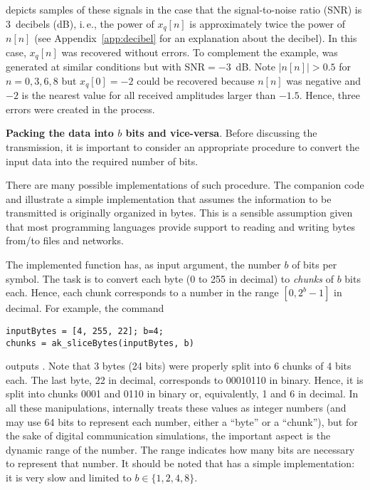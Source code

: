  depicts samples of these signals in the case that the signal-to-noise ratio (SNR) is 3~decibels (dB), i.\,e., the power of $x_q[n]$ is approximately twice the power of $n[n]$ (see Appendix~\ref{app:decibel} for an explanation about the decibel). In this case, $x_q[n]$ was recovered without errors. To complement the example,  was generated at similar conditions but with SNR$=-3$~dB. 
Note $\lvert n[n]\rvert>0.5$ for $n=0,3,6,8$ but $x_q[0]=-2$ could be recovered because $n[n]$ was negative and $-2$ is the nearest value for all received amplitudes larger than $-1.5$.
Hence, three errors were created in the process.
\eApplication

\bApplication 
\textbf{Packing the data into $b$ bits and vice-versa}.
\label{app:matlabpackunpack}
Before discussing the transmission, it is important to consider an appropriate procedure to convert the input data into the required number of bits.

There are many possible implementations of such procedure. The companion code  and  illustrate a simple implementation that assumes the information to be transmitted is originally organized in bytes. This is a sensible assumption given that most programming languages provide support to reading and writing bytes from/to files and networks.

The implemented function has, as input argument, the number $b$ of bits per symbol. The task is to convert each byte (0 to 255 in decimal) to \emph{chunks} of $b$ bits each. Hence, each chunk corresponds to a number in the range $[0, 2^{b}-1]$ in decimal. For example, the command
\begin{lstlisting}
inputBytes = [4, 255, 22]; b=4;
chunks = ak_sliceBytes(inputBytes, b)
\end{lstlisting}
outputs . Note that 3 bytes (24 bits) were properly split into 6 chunks of 4 bits each. The last byte, 22 in decimal, corresponds to 00010110 in binary. Hence, it is split into chunks 0001 and 0110 in binary or, equivalently, 1 and 6 in decimal. In all these manipulations, {\matlab} internally treats these values as integer numbers (and may use 64 bits to represent each number, either a ``byte'' or a ``chunk''), but for the sake of digital communication simulations, the important aspect is the dynamic range of the number. The range indicates how many bits are necessary to represent that number.
It should be noted that  has a simple implementation: it is very slow and limited to $b \in \{1,2,4,8\}$.

